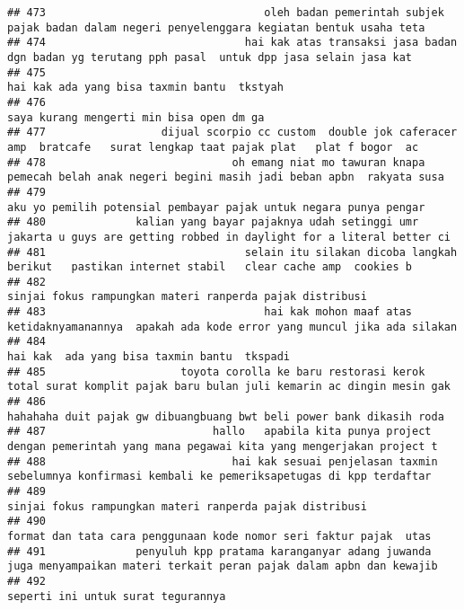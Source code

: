 \documentclass[
]{article}
\begin{document}
\begin{verbatim}
## 473                                  oleh badan pemerintah subjek pajak badan dalam negeri penyelenggara kegiatan bentuk usaha teta 
## 474                               hai kak atas transaksi jasa badan dgn badan yg terutang pph pasal  untuk dpp jasa selain jasa kat 
## 475                                                                                      hai kak ada yang bisa taxmin bantu  tkstyah
## 476                                                                                         saya kurang mengerti min bisa open dm ga
## 477                  dijual scorpio cc custom  double jok caferacer amp  bratcafe   surat lengkap taat pajak plat   plat f bogor  ac
## 478                             oh emang niat mo tawuran knapa pemecah belah anak negeri begini masih jadi beban apbn  rakyata susa 
## 479                                                               aku yo pemilih potensial pembayar pajak untuk negara punya pengar 
## 480              kalian yang bayar pajaknya udah setinggi umr jakarta u guys are getting robbed in daylight for a literal better ci 
## 481                               selain itu silakan dicoba langkah berikut   pastikan internet stabil   clear cache amp  cookies b 
## 482                                                                        sinjai fokus rampungkan materi ranperda pajak distribusi 
## 483                                  hai kak mohon maaf atas ketidaknyamanannya  apakah ada kode error yang muncul jika ada silakan 
## 484                                                                                     hai kak  ada yang bisa taxmin bantu  tkspadi
## 485                     toyota corolla ke baru restorasi kerok total surat komplit pajak baru bulan juli kemarin ac dingin mesin gak
## 486                                                             hahahaha duit pajak gw dibuangbuang bwt beli power bank dikasih roda
## 487                          hallo   apabila kita punya project dengan pemerintah yang mana pegawai kita yang mengerjakan project t 
## 488                             hai kak sesuai penjelasan taxmin sebelumnya konfirmasi kembali ke pemeriksapetugas di kpp terdaftar 
## 489                                                                        sinjai fokus rampungkan materi ranperda pajak distribusi 
## 490                                                              format dan tata cara penggunaan kode nomor seri faktur pajak  utas 
## 491              penyuluh kpp pratama karanganyar adang juwanda juga menyampaikan materi terkait peran pajak dalam apbn dan kewajib 
## 492                                                                                              seperti ini untuk surat tegurannya 

\end{verbatim}
\end{document}
